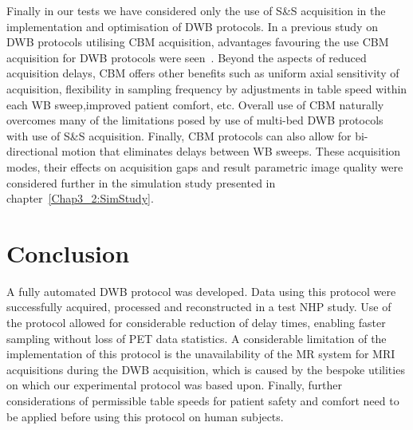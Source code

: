 Finally in our tests we have considered only the use of S\&S acquisition in the implementation and optimisation of DWB protocols. 
In a previous study on DWB protocols utilising CBM acquisition, advantages favouring the use CBM acquisition for DWB protocols were seen~\cite{Karakatsanis2016a}. Beyond the aspects of reduced acquisition delays, CBM offers other benefits such as uniform axial sensitivity of acquisition, flexibility in sampling frequency by adjustments in table speed within each WB sweep,improved patient comfort, etc. 
Overall use of CBM naturally overcomes many of the limitations posed by use of multi-bed DWB protocols with use of S\&S acquisition. 
Finally, CBM protocols can also allow for bi-directional motion that eliminates delays between WB sweeps. 
These acquisition modes, their effects on acquisition gaps and result parametric image quality were considered further in the simulation study presented in chapter~\ref{Chap3_2:SimStudy}.

\section{Conclusion}
A fully automated DWB protocol was developed. Data using this protocol were successfully acquired, processed and reconstructed in a test NHP study.
Use of the protocol allowed for considerable reduction of delay times, enabling faster sampling without loss of PET data statistics.
A considerable limitation of the implementation of this protocol is the unavailability of the MR system for MRI acquisitions during the DWB acquisition, which is caused by the bespoke utilities on which our experimental protocol was based upon.
Finally, further considerations of permissible table speeds for patient safety and comfort need to be applied before using this protocol on human subjects.



